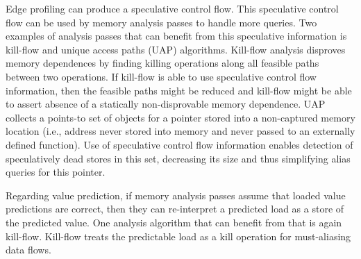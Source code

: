 Edge profiling can produce a speculative control flow. This
speculative control flow can be used by memory analysis passes to
handle more queries.
%
Two examples of analysis passes that can benefit from this speculative
information is kill-flow and unique access paths (UAP) algorithms.
%
Kill-flow analysis disproves memory dependences by finding killing
operations along all feasible paths between two operations.  If
kill-flow is able to use speculative control flow information, then
the feasible paths might be reduced and kill-flow might be able to
assert absence of a statically non-disprovable memory dependence.
%
UAP collects a points-to set of objects for a pointer stored into a
non-captured memory location (i.e., address never stored into memory
and never passed to an externally defined function).
Use of speculative control flow information enables detection of
speculatively dead stores in this set, decreasing its size and thus
simplifying alias queries for this pointer.


Regarding value prediction, if memory analysis passes assume that
loaded value predictions are correct, then they can re-interpret a
predicted load as a store of the predicted value. One analysis
algorithm that can benefit from that is again kill-flow. Kill-flow
treats the predictable load as a kill operation for must-aliasing data
flows.


